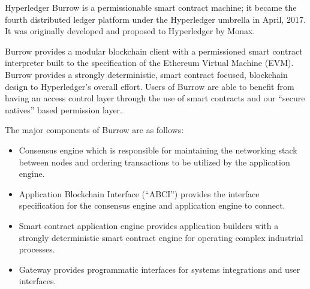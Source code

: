 Hyperledger Burrow is a permissionable smart contract machine; it became the fourth distributed ledger platform under the Hyperledger umbrella in April, 2017. It was originally developed and proposed to Hyperledger by Monax.

Burrow provides a modular blockchain client with a permissioned smart contract interpreter built to the specification of the Ethereum Virtual Machine (EVM). Burrow provides a strongly deterministic, smart contract focused, blockchain design to Hyperledger's overall effort. Users of Burrow are able to benefit from having an access control layer through the use of smart contracts and our “secure natives” based permission layer.

The major components of Burrow are as follows:
\begin{itemize}
\item Consensus engine which is responsible for maintaining the networking stack between nodes and ordering transactions to be utilized by the application engine.
\item Application Blockchain Interface (“ABCI”) provides the interface specification for the consensus engine and application engine to connect.
\item Smart contract application engine provides application builders with a strongly deterministic smart contract engine for operating complex industrial processes.
\item Gateway provides programmatic interfaces for systems integrations and user interfaces.
\end{itemize}
